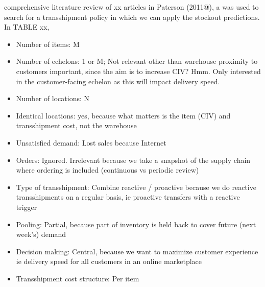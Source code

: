 \documentclass[../../main.tex]{subfiles}
\begin{document}
comprehensive literature review of xx articles in Paterson (2011@), a  was used to search for a transshipment policy in which we can apply the stockout predictions. In TABLE xx, 

\begin{itemize}
\item Number of items: M
\item Number of echelons: 1 or M; Not relevant other than warehouse proximity to customers important, since the aim is to increase CIV? Hmm. Only interested in the customer-facing echelon as this will impact delivery speed.
\item Number of locations: N
\item Identical locations: yes, because what matters is the item (CIV) and transshipment cost, not the warehouse
\item Unsatisfied demand: Lost sales because Internet
\item Orders: Ignored. Irrelevant because we take a snapshot of the supply chain where ordering is included (continuous vs periodic review)
\item Type of transshipment: Combine reactive / proactive because we do reactive transshipments on a regular basis, ie proactive transfers with a reactive trigger
\item Pooling: Partial, because part of inventory is held back to cover future (next week's) demand
\item Decision making: Central, because we want to maximize customer experience ie delivery speed for all customers in an online marketplace
\item Transshipment cost structure: Per item
\end{itemize}




\end{document}
